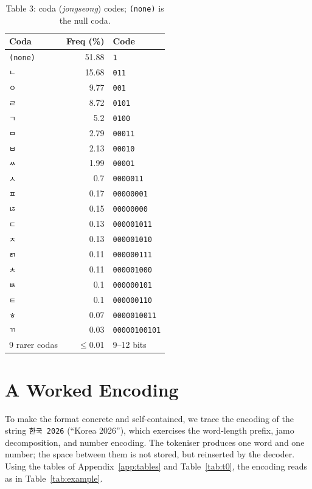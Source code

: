 \documentclass[conference]{IEEEtran}
\begin{document}
\begin{table}[H]
\centering
\small
\caption{Table 3: coda (\emph{jongseong}) codes; \texttt{(none)} is the null coda.}
\begin{tabular}{lrl}
\toprule
Coda & Freq (\%) & Code \\
\midrule
\texttt{(none)} & 51.88 & \texttt{1} \\
\texttt{ㄴ} & 15.68 & \texttt{011} \\
\texttt{ㅇ} & 9.77 & \texttt{001} \\
\texttt{ㄹ} & 8.72 & \texttt{0101} \\
\texttt{ㄱ} & 5.2 & \texttt{0100} \\
\texttt{ㅁ} & 2.79 & \texttt{00011} \\
\texttt{ㅂ} & 2.13 & \texttt{00010} \\
\texttt{ㅆ} & 1.99 & \texttt{00001} \\
\texttt{ㅅ} & 0.7 & \texttt{0000011} \\
\texttt{ㅍ} & 0.17 & \texttt{00000001} \\
\texttt{ㄶ} & 0.15 & \texttt{00000000} \\
\texttt{ㄷ} & 0.13 & \texttt{000001011} \\
\texttt{ㅈ} & 0.13 & \texttt{000001010} \\
\texttt{ㄺ} & 0.11 & \texttt{000000111} \\
\texttt{ㅊ} & 0.11 & \texttt{000001000} \\
\texttt{ㅄ} & 0.1 & \texttt{000000101} \\
\texttt{ㅌ} & 0.1 & \texttt{000000110} \\
\texttt{ㅎ} & 0.07 & \texttt{0000010011} \\
\texttt{ㄲ} & 0.03 & \texttt{00000100101} \\
9 rarer codas & $\le$0.01 & 9--12 bits \\
\bottomrule
\end{tabular}
\end{table}

\section{A Worked Encoding}
\label{app:example}

To make the format concrete and self-contained, we trace the encoding of the
string \texttt{한국 2026} (``Korea 2026''), which exercises the word-length
prefix, jamo decomposition, and number encoding. The tokeniser produces one word
and one number; the space between them is not stored, but reinserted by the
decoder. Using the tables of Appendix~\ref{app:tables} and Table~\ref{tab:t0},
the encoding reads as in Table~\ref{tab:example}.
\end{document}
